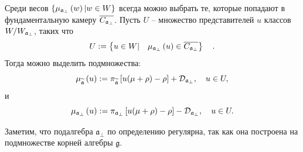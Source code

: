 \documentclass[12pt]{article}
\theoremstyle{definition}
\begin{document}
Среди весов  $\left\{ \mu _{\frak{a}_{\perp
}}\left( w\right) |w\in W\right\} $ всегда можно выбрать те, которые попадают в фундаментальную камеру $\overline{C_{\frak{a}_{\perp }}}$. Пусть $U$ -- множество представителей $u$ классов  $W/W_{\frak{a}_{\perp }}$, таких что
\begin{equation}
U:=\left\{ u\in W|\quad \mu _{\frak{a}_{\perp }}\left( u\right) \in
\overline{C_{\frak{a}_{\perp }}}\right\} \quad .  \label{U-def}
\end{equation}
Тогда можно выделить подмножества:
\begin{equation}
\mu _{\widetilde{\mathfrak{a}}}\left( u\right) :=\pi _{\widetilde{%
\mathfrak{a}}}\left[ u(\mu +\rho )-\rho \right] +\mathcal{D}_{\frak{a}%
_{\perp }},\quad u\in U,  \label{mu-a}
\end{equation}
и
\begin{equation}
\mu _{\frak{a}_{\perp }}\left( u\right) :=\pi _{\frak{a}_{\perp }}\left[
u(\mu +\rho )-\rho \right] -\mathcal{D}_{\frak{a}_{\perp }},\quad u\in U.
\label{mu-a-tilda}
\end{equation}

Заметим, что подалгебра  $\mathfrak{a}_{\bot}$ по определению регулярна, так как она построена на подмножестве корней алгебры $\mathfrak{g}$.
\end{document}
